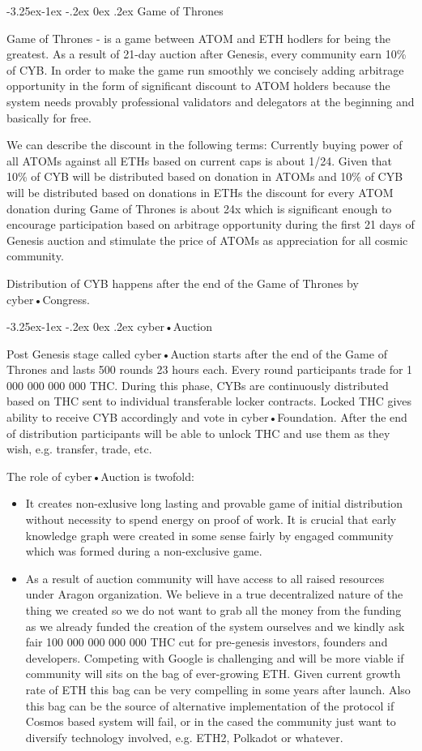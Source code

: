 \documentclass[8pt,oneside]{amsart}
\makeatletter
\renewcommand\subsection{\@startsection{subsection}{2}{\z@}%
                                     {-3.25ex\@plus -1ex \@minus -.2ex}%
                                     {0ex \@plus .2ex}%
                                     {\play\Large}}%
\newcommand{\titleSection}[1]{\subsection{#1}}
\makeatother
\begin{document}
\titleSection{Game of Thrones}\label{got}

Game of Thrones - is a game between ATOM and ETH hodlers for being the greatest. As a result of 21-day auction after Genesis, every community earn 10\% of CYB. In order to make the game run smoothly we concisely adding arbitrage opportunity in the form of significant discount to ATOM holders because the system needs provably professional validators and delegators at the beginning and basically for free.

We can describe the discount in the following terms: Currently buying power of all ATOMs against all ETHs based on current caps is about 1/24. Given that 10\% of CYB will be distributed based on donation in ATOMs and 10\% of CYB will be distributed based on donations in ETHs the discount for every ATOM donation during Game of Thrones is about 24x which is significant enough to encourage participation based on arbitrage opportunity during the first 21 days of Genesis auction and stimulate the price of ATOMs as appreciation for all cosmic community.

Distribution of CYB happens after the end of the Game of Thrones by cyber•Congress.

\titleSection{cyber•Auction}\label{cyberauction}

Post Genesis stage called cyber•Auction starts after the end of the Game of Thrones and lasts 500 rounds 23 hours each. Every round participants trade for 1 000 000 000 000 THC. During this phase, CYBs are continuously distributed based on THC sent to individual transferable locker contracts. Locked THC gives ability to receive CYB accordingly and vote in cyber•Foundation. After the end of distribution participants will be able to unlock THC and use them as they wish, e.g. transfer, trade, etc.

The role of cyber•Auction is twofold:

\begin{itemize}
\item  It creates non-exlusive long lasting and provable game of initial distribution without necessity to spend energy on proof of work. It is crucial that early knowledge graph were created in some sense fairly by engaged community which was formed during a non-exclusive game.
\item  As a result of auction community will have access to all raised resources under Aragon organization. We believe in a true decentralized nature of the thing we created so we do not want to grab all the money from the funding as we already funded the creation of the system ourselves and we kindly ask fair 100 000 000 000 000  THC cut for pre-genesis investors, founders and developers. Competing with Google is challenging and will be more viable if community will sits on the bag of ever-growing ETH. Given current growth rate of ETH this bag can be very compelling in some years after launch. Also this bag can be the source of alternative implementation of the protocol if Cosmos based system will fail, or in the cased the community just want to diversify technology involved, e.g. ETH2, Polkadot or whatever.
\end{itemize}
\end{document}

